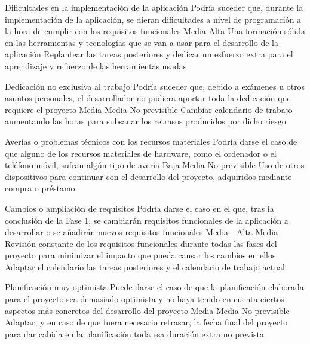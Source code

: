 \riskframe
	{Dificultades en la implementación de la aplicación}
	{Podría suceder que, durante la implementación de la aplicación, se dieran dificultades a nivel de programación a la hora de cumplir con los requisitos funcionales}
	{Media}
	{Alta}
	{Una formación sólida en las herramientas y tecnologías que se van a usar para el desarrollo de la aplicación}
	{Replantear las tareas posteriores y dedicar un esfuerzo extra para el aprendizaje y refuerzo de las herramientas usadas}

\riskframe
	{Dedicación no exclusiva al trabajo}
	{Podría suceder que, debido a exámenes u otros asuntos personales, el desarrollador no pudiera aportar toda la dedicación que requiere el proyecto}
	{Media}
	{Media}
	{No previsible}
	{Cambiar calendario de trabajo aumentando las horas para subsanar los retrasos producidos por dicho riesgo}

\riskframe
	{Averías o problemas técnicos con los recursos materiales}
	{Podría darse el caso de que alguno de los recursos materiales de hardware, como el ordenador o el teléfono móvil, sufran algún tipo de avería}
	{Baja}
	{Media}
	{No previsible}
	{Uso de otros dispositivos para continuar con el desarrollo del proyecto, adquiridos mediante compra o préstamo}

\riskframe
	{Cambios o ampliación de requisitos}
	{Podría darse el caso en el que, tras la conclusión de la Fase 1, se cambiarán requisitos funcionales de la aplicación a desarrollar o se añadirán nuevos requisitos funcionales}
	{Media - Alta}
	{Media}
	{Revisión constante de los requisitos funcionales durante todas las fases del proyecto para minimizar el impacto que pueda causar los cambios en ellos}
	{Adaptar el calendario las tareas posteriores y el calendario de trabajo actual}

\riskframe
	{Planificación muy optimista}
	{Puede darse el caso de que la planificación elaborada para el proyecto sea demasiado optimista y no haya tenido en cuenta ciertos aspectos más concretos del desarrollo del proyecto}
	{Media}
	{Media}
	{No previsible}
	{Adaptar, y en caso de que fuera necesario retrasar, la fecha final del proyecto para dar cabida en la planificación toda  esa duración extra no prevista}